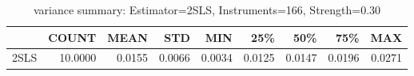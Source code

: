 \begin{table}[ht]
\centering
\caption{variance summary: Estimator=2SLS, Instruments=166, Strength=0.30}
\begin{tabular}{lrrrrrrrr}
\toprule
 & COUNT & MEAN & STD & MIN & 25\% & 50\% & 75\% & MAX \\
\midrule
2SLS & 10.0000 & 0.0155 & 0.0066 & 0.0034 & 0.0125 & 0.0147 & 0.0196 & 0.0271 \\
\bottomrule
\end{tabular}
\end{table}
